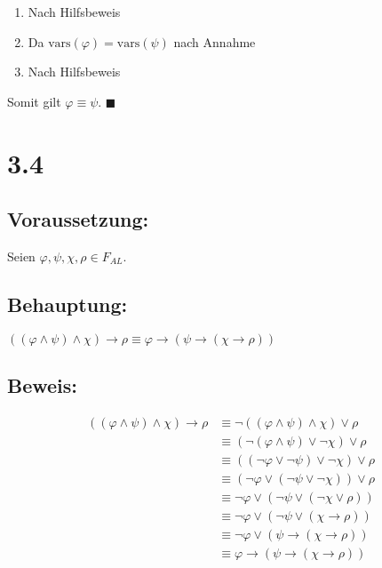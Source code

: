 \documentclass[12pt,a4paper]{scrartcl}
\begin{document}
\begin{enumerate} 
\item Nach Hilfsbeweis
\item Da $\text{vars}(\varphi) = \text{vars}(\psi)$ nach Annahme
\item Nach Hilfsbeweis
\end{enumerate} 

Somit gilt $\varphi \equiv \psi$. $\blacksquare$

\section*{3.4}
 
\subsection*{Voraussetzung:}

Seien $\varphi, \psi, \chi, \rho \in F_{AL}$.

\subsection*{Behauptung:}

$((\varphi \wedge \psi) \wedge \chi) \rightarrow \rho \equiv \varphi
\rightarrow (\psi \rightarrow (\chi \rightarrow \rho))$

\subsection*{Beweis:}

\begin{align}
  ((\varphi \wedge \psi) \wedge \chi) \rightarrow \rho
  	& \equiv \neg((\varphi \wedge \psi) \wedge \chi) \vee \rho \\
  	& \equiv (\neg(\varphi \wedge \psi) \vee \neg\chi) \vee \rho \\
  	& \equiv ((\neg\varphi \vee \neg\psi) \vee \neg\chi) \vee \rho \\
  	& \equiv (\neg\varphi \vee (\neg\psi \vee \neg\chi)) \vee \rho \\
  	& \equiv \neg\varphi \vee (\neg\psi \vee (\neg\chi \vee \rho)) \\
  	& \equiv \neg\varphi \vee (\neg\psi \vee (\chi \rightarrow \rho)) \\
  	& \equiv \neg\varphi \vee (\psi \rightarrow (\chi \rightarrow \rho)) \\
  	& \equiv \varphi \rightarrow (\psi \rightarrow (\chi \rightarrow \rho))
\end{align}
\end{document}
